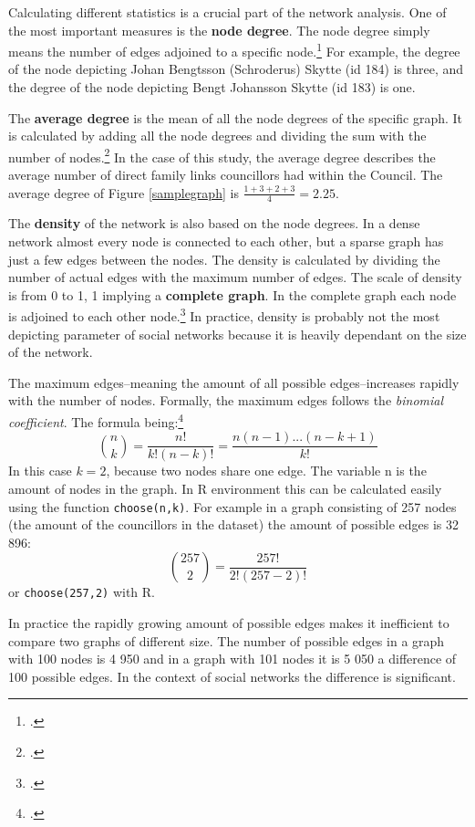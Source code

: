 Calculating different statistics is a crucial part of the network analysis. One of the most important measures is the \textbf{node degree}. The node degree simply means the number of edges adjoined to a specific node.\footcite[pp. 2-3.]{RajPM2018} For example, the degree of the node depicting Johan Bengtsson (Schroderus) Skytte (id 184) is three, and the degree of the node depicting Bengt Johansson Skytte (id 183) is one. 

The \textbf{average degree} is the mean of all the node degrees of the specific graph. It is calculated by adding all the node degrees and dividing the sum with the number of nodes.\footcite[pp. 3-4.]{RajPM2018} In the case of this study, the average degree describes the average number of direct family links councillors had within the Council. The average degree of Figure \ref{samplegraph} is $\frac{1 + 3 + 2 + 3}{4} = 2.25$.

The \textbf{density} of the network is also based on the node degrees. In a dense network almost every node is connected to each other, but a sparse graph has just a few edges between the nodes. The density is calculated by dividing the number of actual edges with the maximum number of edges. The scale of density is from 0 to 1, 1 implying a \textbf{complete graph}. In the complete graph each node is adjoined to each other node.\footcite[pp. 5-6.]{RajPM2018} In practice, density is probably not the most depicting parameter of social networks because it is heavily dependant on the size of the network. 

The maximum edges–meaning the amount of all possible edges–increases rapidly with the number of nodes. Formally, the maximum edges follows the \textit{binomial coefficient}. The formula being:\footcites[p. 16.]{laininen2002}[pp. 5-6.]{RajPM2018}
\begin{equation*}
\binom{n}{k} = \frac{n!}{k!(n-k)!} = \frac{n(n-1)...(n-k+1)}{k!}
\end{equation*}
In this case $k = 2$, because two nodes share one edge. The variable n is the amount of nodes in the graph. In R environment this can be calculated easily using the function \texttt{choose(n,k)}. For example in a graph consisting of 257 nodes (the amount of the councillors in the dataset) the amount of possible edges is 32 896:
\begin{equation*}
\binom{257}{2} = \frac{257!}{2!(257-2)!}
\end{equation*}
or \texttt{choose(257,2)} with R.

In practice the rapidly growing amount of possible edges makes it inefficient to compare two graphs of different size. The number of possible edges in a graph with 100 nodes is 4 950 and in a graph with 101 nodes it is 5 050 a difference of 100 possible edges. In the context of social networks the difference is significant.

